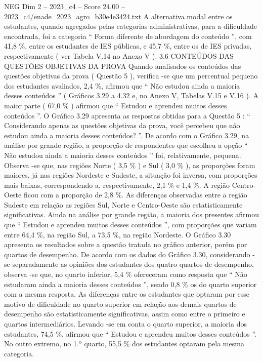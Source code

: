 \begin{textsample}{NEG Dim 2 – 2023\_c4 – Score 24.00 – 2023\_c4/enade\_2023\_agro\_b30e4e3424.txt}
A alternativa modal entre os estudantes, quando agregados pelas categorias administrativas, para a dificuldade encontrada, foi a categoria “ Forma diferente de abordagem do conteúdo ”, com 41,8 \%, entre os estudantes de IES públicas, e 45,7 \%, entre os de IES privadas, respectivamente ( ver Tabela V.14 no Anexo V ). 3.6 CONTEÚDOS DAS QUESTÕES OBJETIVAS DA PROVA Quando analisados os conteúdos das questões objetivas da prova ( Questão 5 ), verifica -se que um percentual pequeno dos estudantes avaliados, 2,4 \%, afirmou que “ Não estudou ainda a maioria desses conteúdos ” ( Gráficos 3.29 a 4.32 e, no Anexo V, Tabelas V.15 e V.16 ).
A maior parte ( 67,0 \% ) afirmou que “ Estudou e aprendeu muitos desses conteúdos ”.
O Gráfico 3.29 apresenta as respostas obtidas para a Questão 5 : “ Considerando apenas as questões objetivas da prova, você percebeu que não estudou ainda a maioria desses conteúdos? ”.
De acordo com o Gráfico 3.29, na análise por grande região, a proporção de respondentes que escolheu a opção “ Não estudou ainda a maioria desses conteúdos ” foi, relativamente, pequena.
Observa -se que, nas regiões Norte ( 3,5 \% ) e Sul ( 3,0 \% ), as proporções foram maiores, já nas regiões Nordeste e Sudeste, a situação foi inversa, com proporções mais baixas, correspondendo a, respectivamente, 2,1 \% e 1,4 \%.
A região Centro-Oeste ficou com a proporção de 2,8 \%.
As diferenças observadas entre a região Sudeste em relação as regiões Sul, Norte e Centro-Oeste são estatisticamente significativas.
Ainda na análise por grande região, a maioria dos presentes afirmou que “ Estudou e aprendeu muitos desses conteúdos ”, com proporções que variam entre 64,4 \%, na região Sul, a 73,5 \%, na região Nordeste.
O Gráfico 3.30 apresenta os resultados sobre a questão tratada no gráfico anterior, porém por quartos de desempenho.
De acordo com os dados do Gráfico 3.30, considerando -se separadamente as opiniões dos estudantes dos quatro quartos de desempenho, observa -se que, no quarto inferior, 5,4 \% ofereceram como resposta que “ Não estudaram ainda a maioria desses conteúdos ”, sendo 0,8 \% os do quarto superior com a mesma resposta.
As diferenças entre os estudantes que optaram por esse motivo de dificuldade no quarto superior em relação aos demais quartos de desempenho são estatisticamente significativas, assim como entre o primeiro e quartos intermediários.
Levando -se em conta o quarto superior, a maioria dos estudantes, 74,5 \%, afirmou que “ Estudou e aprendeu muitos desses conteúdos ”.
No outro extremo, no 1.º quarto, 55,5 \% dos estudantes optaram pela mesma categoria.

\end{textsample}
